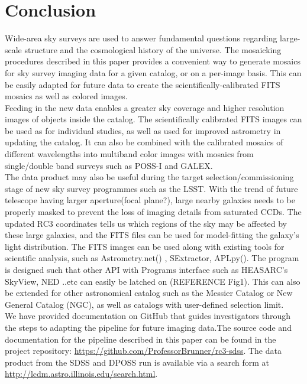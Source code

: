 \documentclass[5p]{elsarticle}
\begin{document}
 \section{Conclusion}
\indent Wide-area sky surveys are used to answer fundamental questions regarding large-scale structure and the cosmological history of the universe. The mosaicking procedures described in this paper provides a convenient way to generate mosaics for sky survey imaging data for a given catalog, or on a per-image basis. This can be easily adapted for future data to create the scientifically-calibrated FITS mosaics as well as colored images. 
\\
\indent Feeding in the new data enables a greater  sky coverage and higher resolution images of objects inside the catalog. The scientifically calibrated FITS images can be used as for individual studies, as well as used for improved astrometry in updating the catalog. It can also be combined with the calibrated mosaics of different wavelengths into multiband color images with mosaics from single/double band surveys such as POSS-I and GALEX.  %
\\
\indent The data product may also be useful  during  the target selection/commissioning stage of new sky survey programmes such as the LSST. With the trend of future telescope having larger aperture(focal plane?), large nearby galaxies needs to be properly masked to prevent the loss of imaging details from saturated CCDs. The updated RC3 coordinates tells us  which regions of the sky may be affected by these large galaxies, and the FITS files can be used for model-fitting the galaxy's light distribution. The FITS images can be used along with existing tools for scientific analysis, such as Astrometry.net(\citet{astrometry.net}) , SExtractor, APLpy(\citet{aplpy}). The program is designed such that other API with Programs interface such as HEASARC's SkyView, NED ..etc can easily be latched on (REFERENCE Fig1). This can also be extended for other astronomical catalog such as the Messier Catalog or New General Catalog (NGC), as well as catalogs with user-defined selection limit. %
\\
\indent We have provided documentation on GitHub  that guides investigators through the steps to adapting the pipeline for future imaging data.The source code and documentation for the pipeline described in this paper can be found in the project repository: \url{https://github.com/ProfessorBrunner/rc3-sdss}. The data product from the SDSS and DPOSS run is available via a search form at \url{http://lcdm.astro.illinois.edu/search.html}.
\end{document}
